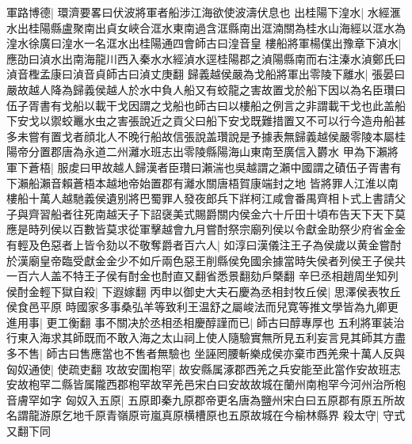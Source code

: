 軍路博德|{
	環濟要畧曰伏波將軍者船涉江海欲使波濤伏息也}
出桂陽下湟水|{
	水經滙水出桂陽縣盧聚南出貞女峽合洭水東南過含洭縣南出洭湳關為桂水山海經以洭水為湟水徐廣曰湟水一名洭水出桂陽通四會師古曰湟音皇}
樓船將軍楊僕出豫章下湞水|{
	應劭曰湞水出南海龍川西入秦水水經湞水逕桂陽郡之湞陽縣南而右注溱水湞鄭氏曰湞音檉孟康曰湞音貞師古曰湞丈庚翻}
歸義越侯嚴為戈船將軍出零陵下離水|{
	張晏曰嚴故越人降為歸義侯越人於水中負人船又有蛟龍之害故置戈於船下因以為名臣瓚曰伍子胥書有戈船以載干戈因謂之戈船也師古曰以樓船之例言之非謂載干戈也此盖船下安戈以禦蛟鼉水虫之害張說近之貢父曰船下安戈既難措置又不可以行今造舟船甚多未嘗有置戈者顔北人不晚行船故信張說盖瓚說是予據表無歸義越侯嚴零陵本屬桂陽帝分置郡唐為永道二州灕水班志出零陵縣陽海山東南至廣信入欝水}
甲為下瀨將軍下蒼梧|{
	服䖍曰甲故越人歸漢者臣瓚曰瀨湍也吳越謂之瀨中國謂之磧伍子胥書有下瀨船瀨音賴蒼梧本越地帝始置郡有灕水關唐梧賀康端封之地}
皆將罪人江淮以南樓船十萬人越馳義侯遺别將巴蜀罪人發夜郎兵下牂柯江咸會番禺齊相卜式上書請父子與齊習船者往死南越天子下詔襃美式賜爵關内侯金六十斤田十頃布告天下天下莫應是時列侯以百數皆莫求從軍擊越會九月嘗酎祭宗廟列侯以令獻金助祭少府省金金有輕及色惡者上皆令劾以不敬奪爵者百六人|{
	如淳曰漢儀注王子為侯歲以黄金嘗酎於漢廟皇帝臨受獻金金少不如斤兩色惡王削縣侯免國余據當時失侯者列侯王子侯共一百六人盖不特王子侯有酎金也酎直又翻省悉景翻劾戶槩翻}
辛巳丞相趙周坐知列侯酎金輕下獄自殺|{
	下遐嫁翻}
丙申以御史大夫石慶為丞相封牧丘侯|{
	思澤侯表牧丘侯食邑平原}
時國家多事桑弘羊等致利王温舒之屬峻法而兒寛等推文學皆為九卿更進用事|{
	更工衡翻}
事不關决於丞相丞相慶醇謹而已|{
	師古曰醇專厚也}
五利將軍装治行東入海求其師既而不敢入海之太山祠上使人隨驗實無所見五利妄言見其師其方盡多不售|{
	師古曰售應當也不售者無驗也}
坐誣罔腰斬樂成侯亦棄市西羌衆十萬人反與匈奴通使|{
	使疏吏翻}
攻故安圍枹罕|{
	故安縣属涿郡西羌之兵安能至此當作安故班志安故枹罕二縣皆属隴西郡枹罕故罕羌邑宋白曰安故故城在蘭州南枹罕今河州治所枹音膚罕如字}
匈奴入五原|{
	五原即秦九原郡帝更名唐為鹽州宋白曰五原郡有原五所故名謂龍游原乞地千原青嶺原岢嵐真原横槽原也五原故城在今榆林縣界}
殺太守|{
	守式又翻下同}


